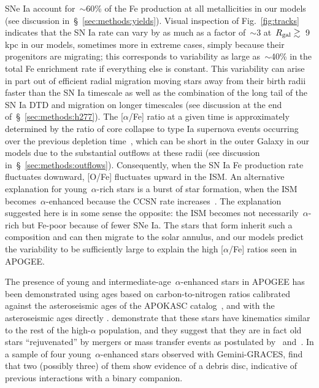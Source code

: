 \documentclass[draft2.tex]{subfiles}
\begin{document}
{\color{red} 
SNe Ia account for~$\sim$60\% of the Fe production at all metallicities 
in our models (see discussion in~\S~\ref{sec:methods:yields}). 
Visual inspection of Fig.~\ref{fig:tracks} indicates that the SN Ia rate can 
vary by as much as a factor of~$\sim$3 at~$R_\text{gal}\gtrsim$~9 kpc in our models, 
sometimes more in extreme cases, simply because their progenitors are 
migrating; this corresponds to variability as large as~$\sim$40\% in the total 
Fe enrichment rate if everything else is constant. 
This variability can arise in part out of efficient radial migration moving 
stars away from their birth radii faster than the SN Ia timescale as well as 
the combination of the long tail of the SN Ia DTD and migration on longer 
timescales (see discussion at the end of~\S~\ref{sec:methods:h277}). 
The [$\alpha$/Fe] ratio at a given time is approximately determined by the 
ratio of core collapse to type Ia supernova events occurring over the previous 
depletion time~\citep{Weinberg2017}, which can be short in the outer Galaxy in 
our models due to the substantial outflows at these radii (see discussion 
in~\S~\ref{sec:methods:outflows}). 
Consequently, when the SN Ia Fe production rate fluctuates downward, [O/Fe] 
fluctuates upward in the ISM. 
An alternative explanation for young~$\alpha$-rich stars is a burst of 
star formation, when the ISM becomes~$\alpha$-enhanced because the CCSN rate 
increases~\citep{Johnson2020}. 
The explanation suggested here is in some sense the opposite: the ISM 
becomes not necessarily~$\alpha$-rich but Fe-poor because of fewer SNe Ia. 
The stars that form inherit such a composition and can then migrate to 
the solar annulus, and our models predict the variability to be sufficiently 
large to explain the high [$\alpha$/Fe] ratios seen in APOGEE. 
}
\par\null\par 
The presence of young and intermediate-age~$\alpha$-enhanced stars in APOGEE 
has been demonstrated using ages based on carbon-to-nitrogen ratios 
\citep{Martig2016} calibrated against the asteroseismic ages of the APOKASC 
catalog~\citep{Pinsonneault2014}, and with the asteroseismic ages directly 
\citep{Martig2015, Jofre2016, Izzard2018, SilvaAguirre2018}. 
\citet{SilvaAguirre2018} demonstrate that these stars have kinematics similar 
to the rest of the high-$\alpha$ population, and they suggest that they are 
in fact old stars ``rejuvenated'' by mergers or mass transfer events 
{\color{red} 
as postulated by~\citet{Jofre2016} and~\citet{Izzard2018}. 
In a sample of four young~$\alpha$-enhanced stars observed with Gemini-GRACES, 
\citet{Yong2016} find that two (possibly three) of them show evidence of a 
debris disc, indicative of previous interactions with a binary companion. 
} 
\end{document}

